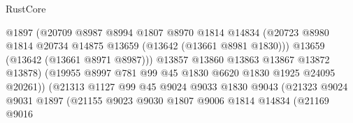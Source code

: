 \begin{lexlean}{RustCore}
\begin{coremodule}
                                        @1897
                                        (@20709
                                          @8987
                                          @8994
                                          @1807
                                          @8970
                                          @1814
                                          @14834
                                          (@20723
                                            @8980
                                            @1814
                                            @20734
                                            @14875
                                            @13659
                                            (@13642 (@13661 @8981 @1830)))
                                          @13659
                                          (@13642 (@13661 @8971 @8987)))
                                        @13857
                                        @13860
                                        @13863
                                        @13867
                                        @13872
                                        @13878)
                                      (@19955
                                        @8997
                                        @781
                                        @99
                                        @45
                                        @1830
                                        @6620
                                        @1830
                                        @1925
                                        @24095
                                        @20261))
                                    (@21313
                                      @1127
                                      @99
                                      @45
                                      @9024
                                      @9033
                                      @1830
                                      @9043
                                      (@21323
                                        @9024
                                        @9031
                                        @1897
                                        (@21155
                                          @9023
                                          @9030
                                          @1807
                                          @9006
                                          @1814
                                          @14834
                                          (@21169
                                            @9016

\end{coremodule}
\end{lexlean}
